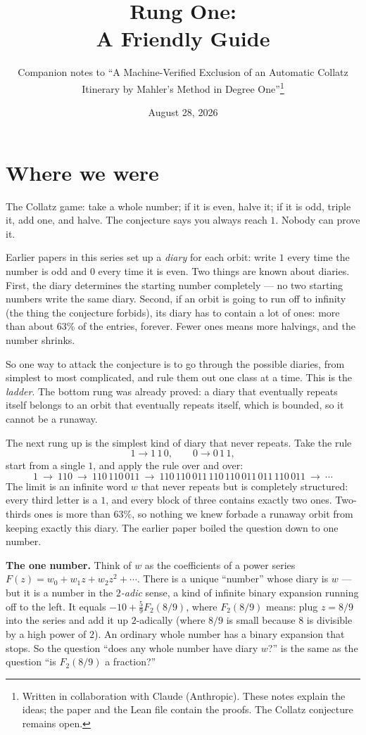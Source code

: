 \documentclass[11pt]{article}
\title{Rung One:\\
       \Large A Friendly Guide}
\author{Companion notes to ``A Machine-Verified Exclusion of an
Automatic Collatz Itinerary by Mahler's Method in Degree
One''\thanks{Written in collaboration with Claude (Anthropic). These
notes explain the ideas; the paper and the Lean file contain the
proofs. The Collatz conjecture remains open.}}
\date{August 28, 2026}
\begin{document}
\maketitle

\section{Where we were}

The Collatz game: take a whole number; if it is even, halve it; if it
is odd, triple it, add one, and halve. The conjecture says you always
reach $1$. Nobody can prove it.

Earlier papers in this series set up a \emph{diary} for each orbit:
write $1$ every time the number is odd and $0$ every time it is even.
Two things are known about diaries. First, the diary determines the
starting number completely --- no two starting numbers write the same
diary. Second, if an orbit is going to run off to infinity (the thing
the conjecture forbids), its diary has to contain a lot of ones:
more than about $63\%$ of the entries, forever. Fewer ones means more
halvings, and the number shrinks.

So one way to attack the conjecture is to go through the possible
diaries, from simplest to most complicated, and rule them out one
class at a time. This is the \emph{ladder}. The bottom rung was
already proved: a diary that eventually repeats itself belongs to an
orbit that eventually repeats itself, which is bounded, so it cannot
be a runaway.

The next rung up is the simplest kind of diary that never repeats.
Take the rule
\[
1 \to 1\,1\,0, \qquad 0 \to 0\,1\,1,
\]
start from a single $1$, and apply the rule over and over:
\[
1 \ \to\ 110 \ \to\ 110\,110\,011 \ \to\ 110\,110\,011\,110\,110\,011\,011\,110\,011 \ \to\ \cdots
\]
The limit is an infinite word $w$ that never repeats but is completely
structured: every third letter is a $1$, and every block of three
contains exactly two ones. Two-thirds ones is more than $63\%$, so
nothing we knew forbade a runaway orbit from keeping exactly this
diary. The earlier paper boiled the question down to one number.

\begin{keyidea}
\textbf{The one number.} Think of $w$ as the coefficients of a power
series $F(z) = w_0 + w_1 z + w_2 z^2 + \cdots$. There is a unique
``number'' whose diary is $w$ --- but it is a number in the
\emph{$2$-adic} sense, a kind of infinite binary expansion running off
to the left. It equals $-10 + \tfrac59 F_2(8/9)$, where $F_2(8/9)$
means: plug $z = 8/9$ into the series and add it up $2$-adically
(where $8/9$ is small because $8$ is divisible by a high power of $2$).
An ordinary whole number has a binary expansion that stops. So the
question ``does any whole number have diary $w$?'' is the same as the
question ``is $F_2(8/9)$ a fraction?''
\end{keyidea}
\end{document}
